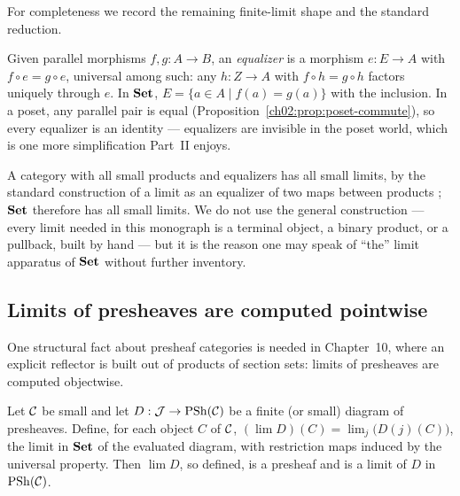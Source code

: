 For completeness we record the remaining finite-limit shape and the
standard reduction.

\begin{definition}[Equalizer]\label{ch02:def:equalizer}
Given parallel morphisms $f, g : A \to B$, an \emph{equalizer} is a
morphism $e : E \to A$ with $f \circ e = g \circ e$, universal among
such: any $h : Z \to A$ with $f \circ h = g \circ h$ factors uniquely
through $e$. In $\mathbf{Set}$, $E = \{a \in A \mid f(a) = g(a)\}$ with the
inclusion. In a poset, any parallel pair is equal
(Proposition~\ref{ch02:prop:poset-commute}), so every equalizer is an
identity --- equalizers are invisible in the poset world, which is
one more simplification Part~II enjoys.
\end{definition}

\begin{remark}\label{ch02:rem:limits-reduction}
A category with all small products and equalizers has all small
limits, by the standard construction of a limit as an equalizer of two
maps between products \cite[Ch.~V]{maclanecwm}; $\mathbf{Set}$ therefore has
all small limits. We do not use the general construction --- every
limit needed in this monograph is a terminal object, a binary product,
or a pullback, built by hand --- but it is the reason one may speak of
``the'' limit apparatus of $\mathbf{Set}$ without further inventory.
\end{remark}

\subsection{Limits of presheaves are computed pointwise}\label{ch02:sec:pointwise}

One structural fact about presheaf categories is needed in Chapter~10,
where an explicit reflector is built out of products of section sets:
limits of presheaves are computed objectwise.

\begin{proposition}\label{ch02:prop:pointwise}
Let $\mathcal{C}$ be small and let $D : \mathcal{J} \to \mathrm{PSh}(\mathcal{C})$ be a finite
(or small) diagram of presheaves. Define, for each object $C$ of
$\mathcal{C}$, $(\lim D)(C) = \lim_j \bigl(D(j)(C)\bigr)$, the limit in
$\mathbf{Set}$ of the evaluated diagram, with restriction maps induced by the
universal property. Then $\lim D$, so defined, is a presheaf and is a
limit of $D$ in $\mathrm{PSh}(\mathcal{C})$.
\end{proposition}

